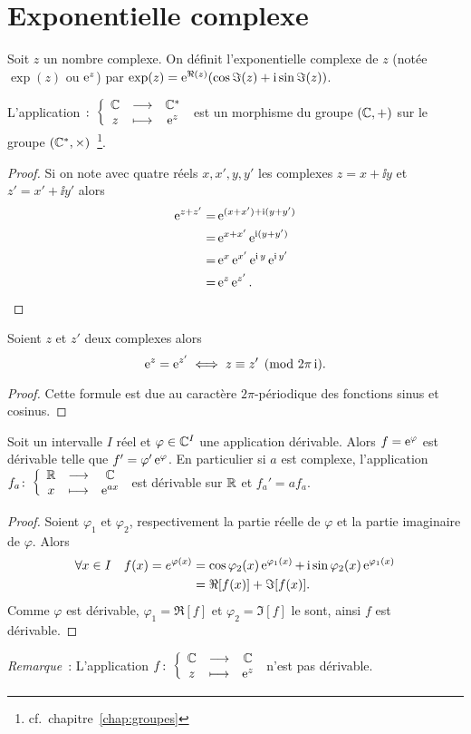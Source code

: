 \section{Exponentielle complexe}
\label{sec:expcomplexe}
\begin{defdef}
  Soit \(z\) un nombre complexe. On définit l'exponentielle complexe de \(z\) (notée \(\exp(z)\) ou \(\operatorname{e}^z\)) par \(\exp(z)=\operatorname{e}^{\Re(z)}(\cos \Im(z) + \operatorname{i} \sin \Im(z))\).
\end{defdef}
\begin{prop}
  L'application \(\colon \left\{\begin{array}{ccc} \mathbb{C} & \longrightarrow &\mathbb{C}^*\\ z & \longmapsto & \operatorname{e}^z \end{array} \right.\) est un morphisme du groupe \((\mathbb{C},+)\) sur le groupe \((\mathbb{C}^*,\times)\)~\footnote{cf.\ chapitre~\ref{chap:groupes}}.
\end{prop}
\begin{proof}
  Si on note avec quatre réels \(x,x',y,y'\) les complexes \(z=x+\ii y\) et \(z'=x'+\ii y'\) alors
  \begin{align}
    \operatorname{e}^{z+z'} =& \operatorname{e}^{(x+x') + \operatorname{i}(y+y')}\\
    =&\operatorname{e}^{x+x'} \operatorname{e}^{\operatorname{i} (y+y')}\\
    =& \operatorname{e}^{x} \operatorname{e}^{x'} \operatorname{e}^{\operatorname{i} y} \operatorname{e}^{\operatorname{i} y'}\\
    =& \operatorname{e}^z \operatorname{e}^{z'}.
  \end{align}
\end{proof}
%
\begin{prop}
  Soient \(z\) et \(z'\) deux complexes alors
  \begin{equation}
    \operatorname{e}^z=\operatorname{e}^{z'} \iff z \equiv z' \pmod {2\pi \operatorname{i}}.
  \end{equation}
\end{prop}
\begin{proof}
   Cette formule est due au caractère \(2\pi\)-périodique des fonctions sinus et cosinus.
 \end{proof}
%
 \begin{prop}
   Soit un intervalle \(I\) réel et \(\varphi \in \mathbb{C}^{I}\) une application dérivable. Alors \(f=\operatorname{e}^\varphi\) est dérivable telle que \(f'=\varphi' \operatorname{e}^\varphi\). En particulier si \(a\) est complexe, l'application \(f_a\colon \left\{\begin{array}{ccc} \mathbb{R} & \longrightarrow &\mathbb{C}\\ x & \longmapsto & \operatorname{e}^{ax} \end{array} \right.\) est dérivable sur \(\mathbb{R}\) et \(f_a'=af_a\).
 \end{prop}
 \begin{proof}
   Soient \(\varphi_1\) et \(\varphi_2\), respectivement la partie réelle de \(\varphi\) et la partie imaginaire de \(\varphi\). Alors
   \begin{align}
     \forall x \in I \quad f(x)=e^{\varphi(x)}&=\cos \varphi_2(x) \operatorname{e}^{\varphi_1(x)}+ \operatorname{i} \sin \varphi_2(x)\operatorname{e}^{\varphi_1(x)} \\
     &= \Re[f(x)] + \Im[f(x)].
   \end{align}
  Comme \(\varphi\) est dérivable, \(\varphi_1=\Re[f]\) et \(\varphi_2=\Im[f]\) le sont, ainsi \(f\) est dérivable.
\end{proof}
\emph{Remarque}~: L'application \(f\colon \left\{\begin{array}{ccc} \mathbb{C} & \longrightarrow &\mathbb{C}\\ z & \longmapsto & \operatorname{e}^z \end{array} \right.\) n'est pas dérivable.
